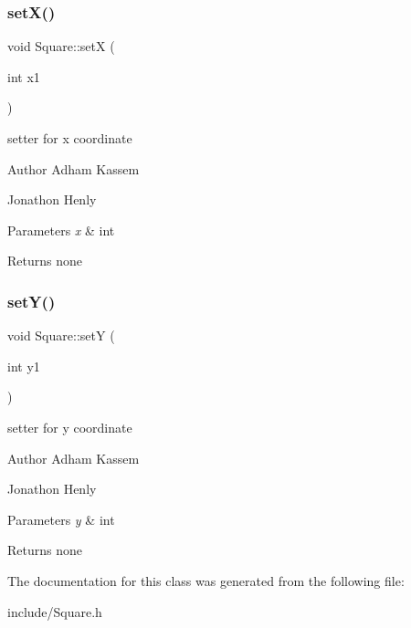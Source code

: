 \subsubsection{\texorpdfstring{set\+X()}{setX()}}
{\footnotesize\ttfamily void Square\+::setX (\begin{DoxyParamCaption}\item[{int}]{x1 }\end{DoxyParamCaption})\hspace{0.3cm}{\ttfamily [inline]}}

setter for x coordinate \begin{DoxyAuthor}{Author}
Adham Kassem 

Jonathon Henly 
\end{DoxyAuthor}

\begin{DoxyParams}{Parameters}
{\em x} & int \\
\hline
\end{DoxyParams}
\begin{DoxyReturn}{Returns}
none 
\end{DoxyReturn}
\mbox{\label{classSquare_ae848f077c458cd512218c1152f31dba0}} 
\subsubsection{\texorpdfstring{set\+Y()}{setY()}}
{\footnotesize\ttfamily void Square\+::setY (\begin{DoxyParamCaption}\item[{int}]{y1 }\end{DoxyParamCaption})\hspace{0.3cm}{\ttfamily [inline]}}

setter for y coordinate \begin{DoxyAuthor}{Author}
Adham Kassem 

Jonathon Henly 
\end{DoxyAuthor}

\begin{DoxyParams}{Parameters}
{\em y} & int \\
\hline
\end{DoxyParams}
\begin{DoxyReturn}{Returns}
none 
\end{DoxyReturn}


The documentation for this class was generated from the following file\+:\begin{DoxyCompactItemize}
\item 
include/Square.\+h\end{DoxyCompactItemize}
